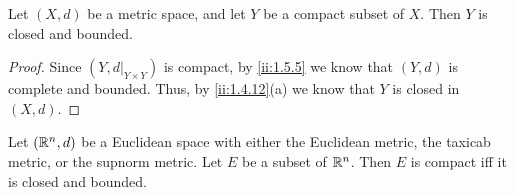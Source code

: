 \begin{cor}\label{ii:1.5.6}
  Let \((X, d)\) be a metric space, and let \(Y\) be a compact subset of \(X\).
  Then \(Y\) is closed and bounded.
\end{cor}

\begin{proof}
  Since \((Y, d|_{Y \times Y})\) is compact, by \cref{ii:1.5.5} we know that \((Y, d)\) is complete and bounded.
  Thus, by \cref{ii:1.4.12}(a) we know that \(Y\) is closed in \((X, d)\).
\end{proof}

\begin{thm}\label{ii:1.5.7}
  Let \((\mathbb{R}^n, d)\) be a Euclidean space with either the Euclidean metric, the taxicab metric, or the supnorm metric.
  Let \(E\) be a subset of \(\mathbb{R}^n\).
  Then \(E\) is compact iff it is closed and bounded.
\end{thm}

